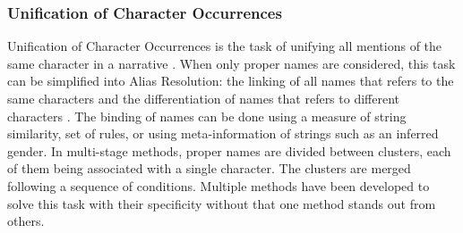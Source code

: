 \documentclass[a4paper, 12pt]{report}
\begin{document}
\subsubsection{Unification of Character Occurrences}
Unification of Character Occurrences is the task of unifying all mentions of the same character in a narrative \citep{fiction}.
When only proper names are considered, this task can be simplified into Alias Resolution:
the linking of all names that refers to the same characters and the differentiation of names that refers to different characters \citep{book_social}.
The binding of names can be done using a measure of string similarity, set of rules, or using meta-information of strings such as an inferred gender.
In multi-stage methods, proper names are divided between clusters, each of them being associated with a single character. The clusters are merged following a sequence of conditions.
Multiple methods have been developed to solve this task with their specificity without that one method stands out from others.\\
\end{document}
